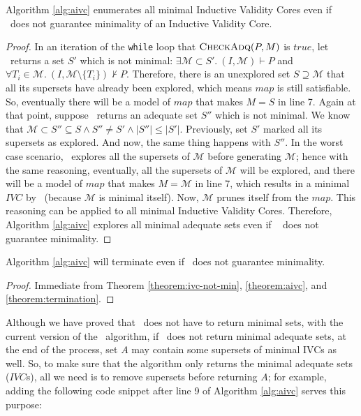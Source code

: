 \begin{theorem}
\label{theorem:ivc-not-min}
  Algorithm \ref{alg:aivc} enumerates all minimal Inductive Validity Cores
  even if \getivc ~does not guarantee minimality of an Inductive Validity Core.
\end{theorem}
\begin{proof}
In an iteration of the \texttt{while} loop that $\textsc{CheckAdq} (P, M)$ is $true$,
let \getivc ~returns a set $S'$ which is not minimal:
$\exists \mathcal{M} \subset S'.~ (I, \mathcal{M}) \vdash P$ and
$\forall T_i \in \mathcal{M} . ~ (I, \mathcal{M} \setminus \{T_i\}) \nvdash P$.
Therefore, there is an unexplored set $S \supseteq \mathcal{M}$ that all its supersets have already been explored, which means
$map$ is still satisfiable.
So, eventually there will be a model of $map$ that makes $M = S$ in line 7.
Again at that point, suppose \getivc ~returns an adequate set $S''$ which is not minimal.
We know that
  $\mathcal{M} \subset S'' \subseteq S \wedge S'' \neq S' \wedge |S''| \leq |S'|$.
  Previously, set $S'$ marked all its supersets as explored. And now, the
  same thing happens with $S''$. 
  In the worst case scenario, \getivc
   ~explores all the supersets of $\mathcal{M}$ 
   before generating $\mathcal{M}$; hence with the same reasoning,
  eventually, all the supersets of $\mathcal{M}$ will be explored, and there will be a model of $map$ that makes $M = \mathcal{M}$ in line 7,
  which results in a minimal $IVC$ by \getivc ~(because $\mathcal{M}$ is minimal itself).
  Now,  $\mathcal{M}$  prunes itself from the $map$. 
  This reasoning can be applied to all minimal Inductive Validity Cores.
  Therefore, Algorithm \ref{alg:aivc} explores all minimal adequate sets even if \getivc ~
  does not guarantee minimality.
\end{proof}

\begin{theorem}
 Algorithm \ref{alg:aivc} will terminate even if \getivc ~does not guarantee minimality.
\end{theorem}
\begin{proof}
  Immediate from Theorem \ref{theorem:ivc-not-min}, \ref{theorem:aivc}, and \ref{theorem:termination}.
\end{proof}

Although we have proved that \getivc ~does not have to return minimal sets, 
with the current version of the \aivcalg ~algorithm, if \getivc ~does not
return minimal adequate sets, at the end of the process,
 set $A$ may contain some supersets of
minimal IVCs as well. So, to make sure that the algorithm only returns 
the minimal adequate sets ($IVC$s), all we need is to 
remove supersets before returning $A$; for example, adding the following code snippet after line 9 of Algorithm \ref{alg:aivc} serves this purpose:

